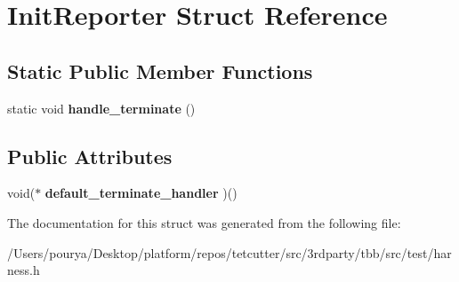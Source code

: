 \hypertarget{structInitReporter}{}\section{Init\+Reporter Struct Reference}
\label{structInitReporter}
\subsection*{Static Public Member Functions}
\begin{DoxyCompactItemize}
\item 
\hypertarget{structInitReporter_aa597a8fe5a6ade3bb4324a4f952f640b}{}static void {\bfseries handle\+\_\+terminate} ()\label{structInitReporter_aa597a8fe5a6ade3bb4324a4f952f640b}

\end{DoxyCompactItemize}
\subsection*{Public Attributes}
\begin{DoxyCompactItemize}
\item 
\hypertarget{structInitReporter_ab0464c136b1a900b1db16772efde2d14}{}void($\ast$ {\bfseries default\+\_\+terminate\+\_\+handler} )()\label{structInitReporter_ab0464c136b1a900b1db16772efde2d14}

\end{DoxyCompactItemize}


The documentation for this struct was generated from the following file\+:\begin{DoxyCompactItemize}
\item 
/\+Users/pourya/\+Desktop/platform/repos/tetcutter/src/3rdparty/tbb/src/test/harness.\+h\end{DoxyCompactItemize}
